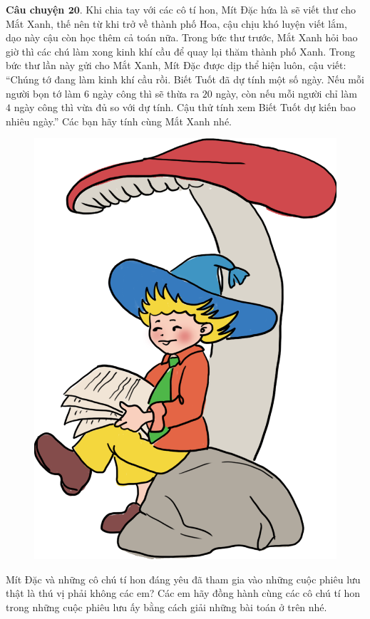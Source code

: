 	\textbf{\color{toancuabi}Câu chuyện $\pmb{20.}$} Khi chia tay với các cô tí hon, Mít Đặc hứa là sẽ viết thư cho Mắt Xanh, thế nên từ khi trở về thành phố Hoa, cậu chịu khó luyện viết lắm, dạo này cậu còn học thêm cả toán nữa. Trong bức thư trước, Mắt Xanh hỏi bao giờ thì các chú làm xong kinh khí cầu để quay lại thăm thành phố Xanh. Trong bức thư lần này gửi cho Mắt Xanh, Mít Đặc được dịp thể hiện luôn, cậu viết: “Chúng tớ đang làm kinh khí cầu rồi. Biết Tuốt đã dự tính một số ngày. Nếu mỗi người bọn tớ làm $6$ ngày công thì sẽ thừa ra $20$ ngày, còn nếu mỗi người chỉ làm $4$ ngày công thì vừa đủ so với dự tính. Cậu thử tính xem Biết Tuốt dự kiến bao nhiêu ngày.” Các bạn hãy tính cùng Mắt Xanh nhé.
	\begin{figure}[H]
		\centering
		\vspace*{-5pt}
		\captionsetup{labelformat= empty, justification=centering}
		\includegraphics[width=0.35\linewidth]{Hinh22_MitDacLamToan}
		\vspace*{-10pt}
	\end{figure}
	Mít Đặc và những cô chú tí hon đáng yêu đã tham gia vào những cuộc phiêu lưu thật là thú vị phải không các em? Các em hãy đồng hành cùng các cô chú tí hon trong những cuộc phiêu lưu ấy bằng cách giải những bài toán ở trên nhé. 
